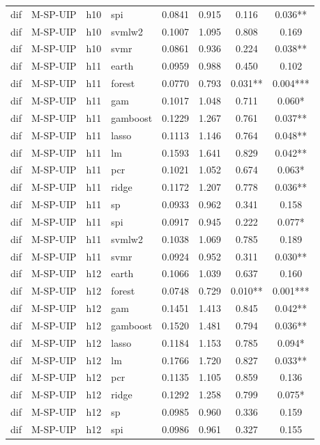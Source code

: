 \begin{ThreePartTable}
\begin{longtable}[t]{llclcccc}
dif & M-SP-UIP & h10 & spi & 0.0841 & 0.915 & 0.116 & 0.036**\\
dif & M-SP-UIP & h10 & svmlw2 & 0.1007 & 1.095 & 0.808 & 0.169\\
dif & M-SP-UIP & h10 & svmr & 0.0861 & 0.936 & 0.224 & 0.038**\\
\addlinespace
dif & M-SP-UIP & h11 & earth & 0.0959 & 0.988 & 0.450 & 0.102\\
dif & M-SP-UIP & h11 & forest & 0.0770 & 0.793 & 0.031** & 0.004***\\
dif & M-SP-UIP & h11 & gam & 0.1017 & 1.048 & 0.711 & 0.060*\\
dif & M-SP-UIP & h11 & gamboost & 0.1229 & 1.267 & 0.761 & 0.037**\\
dif & M-SP-UIP & h11 & lasso & 0.1113 & 1.146 & 0.764 & 0.048**\\
dif & M-SP-UIP & h11 & lm & 0.1593 & 1.641 & 0.829 & 0.042**\\
dif & M-SP-UIP & h11 & pcr & 0.1021 & 1.052 & 0.674 & 0.063*\\
dif & M-SP-UIP & h11 & ridge & 0.1172 & 1.207 & 0.778 & 0.036**\\
dif & M-SP-UIP & h11 & sp & 0.0933 & 0.962 & 0.341 & 0.158\\
dif & M-SP-UIP & h11 & spi & 0.0917 & 0.945 & 0.222 & 0.077*\\
dif & M-SP-UIP & h11 & svmlw2 & 0.1038 & 1.069 & 0.785 & 0.189\\
dif & M-SP-UIP & h11 & svmr & 0.0924 & 0.952 & 0.311 & 0.030**\\
\addlinespace
dif & M-SP-UIP & h12 & earth & 0.1066 & 1.039 & 0.637 & 0.160\\
dif & M-SP-UIP & h12 & forest & 0.0748 & 0.729 & 0.010** & 0.001***\\
dif & M-SP-UIP & h12 & gam & 0.1451 & 1.413 & 0.845 & 0.042**\\
dif & M-SP-UIP & h12 & gamboost & 0.1520 & 1.481 & 0.794 & 0.036**\\
dif & M-SP-UIP & h12 & lasso & 0.1184 & 1.153 & 0.785 & 0.094*\\
dif & M-SP-UIP & h12 & lm & 0.1766 & 1.720 & 0.827 & 0.033**\\
dif & M-SP-UIP & h12 & pcr & 0.1135 & 1.105 & 0.859 & 0.136\\
dif & M-SP-UIP & h12 & ridge & 0.1292 & 1.258 & 0.799 & 0.075*\\
dif & M-SP-UIP & h12 & sp & 0.0985 & 0.960 & 0.336 & 0.159\\
dif & M-SP-UIP & h12 & spi & 0.0986 & 0.961 & 0.327 & 0.155\\

\end{longtable}
\end{ThreePartTable}
